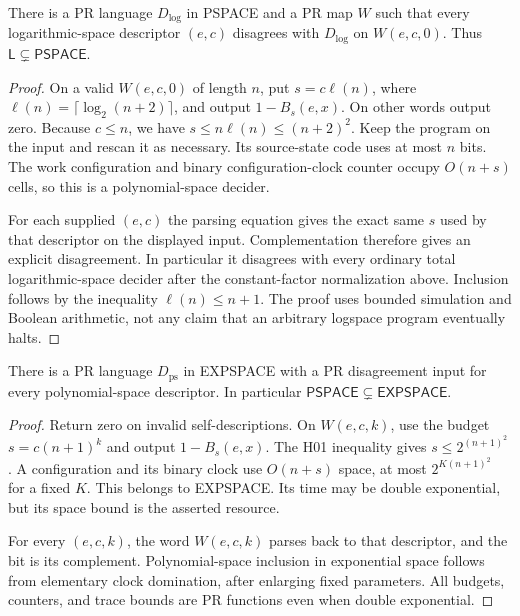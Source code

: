 \begin{theorem}\label{thm:H03}
There is a PR language $D_{\log}$ in PSPACE and a PR map $W$ such that every logarithmic-space descriptor $(e,c)$ disagrees with $D_{\log}$ on $W(e,c,0)$. Thus $\mathsf L\subsetneq\mathsf{PSPACE}$.
\end{theorem}
\begin{proof}
On a valid $W(e,c,0)$ of length $n$, put $s=c\ell(n)$, where $\ell(n)=\lceil\log_2(n+2)\rceil$, and output $1-B_s(e,x)$. On other words output zero. Because $c\le n$, we have $s\le n\ell(n)\le(n+2)^2$. Keep the program on the input and rescan it as necessary. Its source-state code uses at most $n$ bits. The work configuration and binary configuration-clock counter occupy $O(n+s)$ cells, so this is a polynomial-space decider.

For each supplied $(e,c)$ the parsing equation gives the exact same $s$ used by that descriptor on the displayed input. Complementation therefore gives an explicit disagreement. In particular it disagrees with every ordinary total logarithmic-space decider after the constant-factor normalization above. Inclusion follows by the inequality $\ell(n)\le n+1$. The proof uses bounded simulation and Boolean arithmetic, not any claim that an arbitrary logspace program eventually halts.
\end{proof}

\begin{theorem}\label{thm:H04}
There is a PR language $D_{\mathrm{ps}}$ in EXPSPACE with a PR disagreement input for every polynomial-space descriptor. In particular $\mathsf{PSPACE}\subsetneq\mathsf{EXPSPACE}$.
\end{theorem}
\begin{proof}
Return zero on invalid self-descriptions. On $W(e,c,k)$, use the budget $s=c(n+1)^k$ and output $1-B_s(e,x)$. The H01 inequality gives $s\le2^{(n+1)^2}$. A configuration and its binary clock use $O(n+s)$ space, at most $2^{K(n+1)^2}$ for a fixed $K$. This belongs to EXPSPACE. Its time may be double exponential, but its space bound is the asserted resource.

For every $(e,c,k)$, the word $W(e,c,k)$ parses back to that descriptor, and the bit is its complement. Polynomial-space inclusion in exponential space follows from elementary clock domination, after enlarging fixed parameters. All budgets, counters, and trace bounds are PR functions even when double exponential.
\end{proof}

